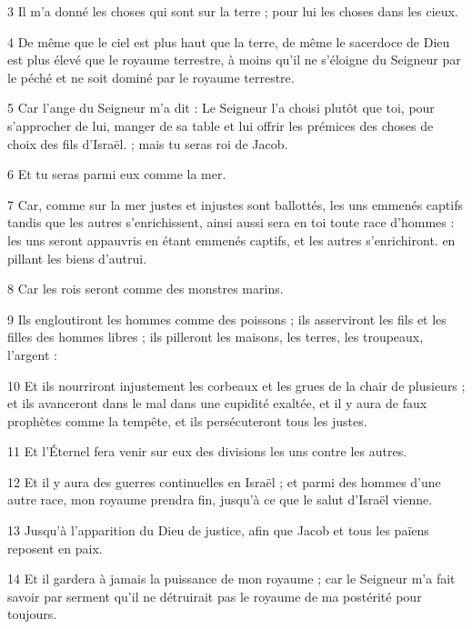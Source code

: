 \par 3 Il m'a donné les choses qui sont sur la terre ; pour lui les choses dans les cieux.

\par 4 De même que le ciel est plus haut que la terre, de même le sacerdoce de Dieu est plus élevé que le royaume terrestre, à moins qu'il ne s'éloigne du Seigneur par le péché et ne soit dominé par le royaume terrestre.

\par 5 Car l'ange du Seigneur m'a dit : Le Seigneur l'a choisi plutôt que toi, pour s'approcher de lui, manger de sa table et lui offrir les prémices des choses de choix des fils d'Israël. ; mais tu seras roi de Jacob.

\par 6 Et tu seras parmi eux comme la mer.

\par 7 Car, comme sur la mer justes et injustes sont ballottés, les uns emmenés captifs tandis que les autres s'enrichissent, ainsi aussi sera en toi toute race d'hommes : les uns seront appauvris en étant emmenés captifs, et les autres s'enrichiront. en pillant les biens d'autrui.

\par 8 Car les rois seront comme des monstres marins.

\par 9 Ils engloutiront les hommes comme des poissons ; ils asserviront les fils et les filles des hommes libres ; ils pilleront les maisons, les terres, les troupeaux, l'argent :

\par 10 Et ils nourriront injustement les corbeaux et les grues de la chair de plusieurs ; et ils avanceront dans le mal dans une cupidité exaltée, et il y aura de faux prophètes comme la tempête, et ils persécuteront tous les justes.

\par 11 Et l'Éternel fera venir sur eux des divisions les uns contre les autres.

\par 12 Et il y aura des guerres continuelles en Israël ; et parmi des hommes d'une autre race, mon royaume prendra fin, jusqu'à ce que le salut d'Israël vienne.

\par 13 Jusqu'à l'apparition du Dieu de justice, afin que Jacob et tous les païens reposent en paix.

\par 14 Et il gardera à jamais la puissance de mon royaume ; car le Seigneur m'a fait savoir par serment qu'il ne détruirait pas le royaume de ma postérité pour toujours.

